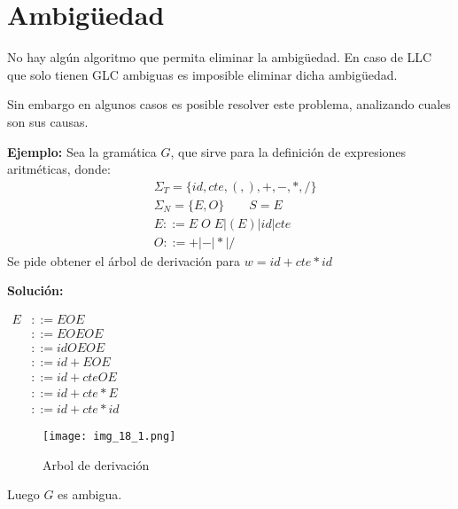 \section{Ambigüedad}
No hay algún algoritmo que permita eliminar la ambigüedad. En caso de LLC que solo tienen GLC ambiguas es imposible eliminar dicha ambigüedad.

Sin embargo en algunos casos es posible resolver este problema, analizando cuales son sus causas.

\textbf{Ejemplo: }Sea la gramática $G$, que sirve para la definición de expresiones aritméticas, donde:
\begin{align*}
&\Sigma_T=\{id,cte,(,),+,-,*,/ \}	\\
&\Sigma_N=\{E,O\}\qquad S=E	\\
&E::=E\;O\;E|(E)|id|cte	\\
&O::=+|-|*|/	
\end{align*}
Se pide obtener el árbol de derivación para $w=id+cte*id$

\textbf{Solución: }
\begin{center}
$\begin{array}{cl}
E	&::=EOE	\\
	&::=EOEOE	\\
	&::=idOEOE	\\
	&::=id+EOE	\\
	&::=id+cteOE	\\
	&::=id+cte*E	\\
	&::=id+cte*id \end{array}$
\end{center}
\begin{figure}[h!]
\centering
\texttt{[image: img\_18\_1.png]}
\caption{Arbol de derivación}\label{img_18_1}
\end{figure}
Luego $G$ es ambigua.

